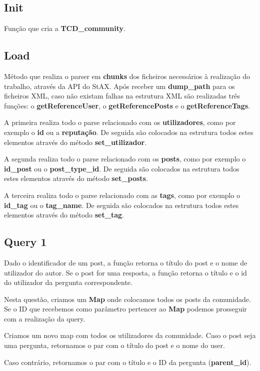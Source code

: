 \documentclass[a4paper]{article}
\begin{document}
\subsection{Init}

Função que cria a \textbf{TCD\_community}. 

\subsection{Load}
Método que realiza o parser em \textbf{chunks} dos ficheiros necessários à 
realização do trabalho, através da API do StAX. Após receber um 
\textbf{dump\_path} para os ficheiros  XML, caso não existam falhas na 
estrutura XML são realizadas três funções: o \textbf{getReferenceUser}, 
o \textbf{getReferencePosts} e o \textbf{getReferenceTags}.

A primeira realiza todo o parse relacionado com os \textbf{utilizadores}, 
como por exemplo o \textbf{id} ou a \textbf{reputação}. De seguida são 
colocados na estrutura todos estes elementos através do método
\textbf{set\_utilizador}.

A segunda realiza todo o parse relacionado com os \textbf{posts}, 
como por exemplo o \textbf{id\_post} ou o \textbf{post\_type\_id}. 
De seguida são colocados na estrutura todos estes elementos através do 
método \textbf{set\_posts}.

A terceira realiza todo o parse relacionado com as \textbf{tags}, 
como por exemplo o \textbf{id\_tag} ou o \textbf{tag\_name}. 
De seguida são colocados na estrutura todos estes elementos através do 
método \textbf{set\_tag}.

\subsection{Query 1}

Dado o identificador de um post, a função retorna o título do post 
e o nome de utilizador do autor. Se o post for uma resposta, a função
retorna o título e o id do utilizador da pergunta correspondente.

Nesta questão, criamos um  \textbf{Map} onde colocamos todos os posts da comunidade.
Se o ID que recebemos como parâmetro pertencer ao  \textbf{Map} podemos prosseguir
com a realização da query.

Criamos um novo map com todos os utilizadores da comunidade. Caso o post seja 
uma pergunta, retornamos o par com o título do post e o nome do user.

Caso contrário, retornamos o par com o título e o ID da pergunta 
(\textbf{parent\_id}).
\end{document}
